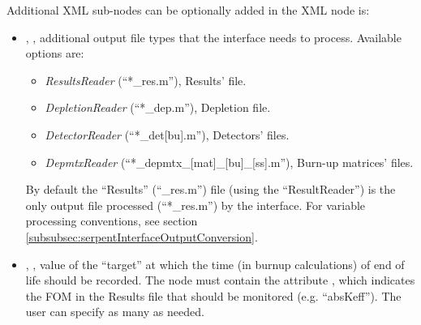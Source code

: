 Additional XML sub-nodes can be optionally added in the  XML node is:
\begin{itemize}
   \item {}, ,  additional output file types 
                                                              that the interface needs to process.  
                                                              Available options are:  
                                                              \begin{itemize}
                                                                \item  \textit{ResultsReader} (``*\_res.m''), Results’ file.
                                                                \item  \textit{DepletionReader} (``*\_dep.m''), Depletion file.
                                                                 \item \textit{DetectorReader}  (``*\_det[bu].m''), Detectors’ files.
                                                                \item  \textit{DepmtxReader} (``*\_depmtx\_[mat]\_[bu]\_[ss].m''), Burn-up matrices’ files.
                                                              \end{itemize}
                                                              \nb By default  the ``Results'' (``\_res.m'') file (using the ``ResultReader'') is the 
                                                               only output file processed (``*\_res.m'') by the interface. 
                                                               For variable processing conventions, see section  
                                                               \ref{subsubsec:serpentInterfaceOutputConversion}.
   \item {}, ,  value of the ``target'' at which the time (in burnup calculations) of end of life should be recorded.
                                                             The   node  must contain the attribute , which indicates the FOM in the Results file that should be
                                                             monitored (e.g. ``absKeff''). The user can specify as many   as needed.
                                                              

\end{itemize}
